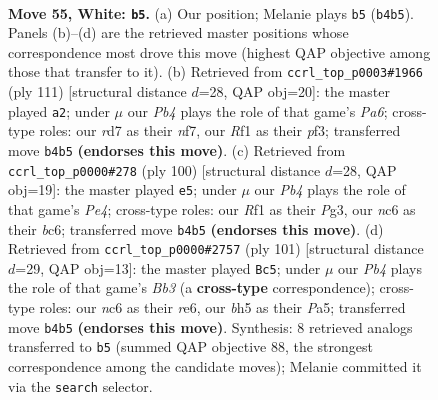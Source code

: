 \documentclass[11pt]{article}
\begin{document}
\clearpage

\begin{figure}[p]\centering
\begin{subfigure}{0.46\textwidth}\centering
\resizebox{\linewidth}{!}{%
\newchessgame
\chessboard[
  setfen={2k5/3r4/p1n2P2/7b/PP6/2B5/7K/5R2 w - - 1 55},
  showmover=false,
  pgfstyle=straightmove, color=movearrow, markmove={b4-b5}
]}
\caption{}
\end{subfigure}\hfill
\begin{subfigure}{0.46\textwidth}\centering
\resizebox{\linewidth}{!}{%
\newchessgame
\chessboard[
  setfen={5b2/2p2N1k/2p5/8/2P5/p4P2/2N1K3/8 b - - 0 56},
  showmover=false,
  pgfstyle=straightmove, color=movearrow, markmove={a3-a2}
]}
\caption{}
\end{subfigure}
\\[4pt]
\begin{subfigure}{0.46\textwidth}\centering
\resizebox{\linewidth}{!}{%
\newchessgame
\chessboard[
  setfen={8/2B4p/p1b5/P5k1/3KP3/6P1/8/8 w - - 2 51},
  showmover=false,
  pgfstyle=straightmove, color=movearrow, markmove={e4-e5}
]}
\caption{}
\end{subfigure}\hfill
\begin{subfigure}{0.46\textwidth}\centering
\resizebox{\linewidth}{!}{%
\newchessgame
\chessboard[
  setfen={5k2/6p1/1b2R2p/pB5P/3r4/6P1/6K1/8 b - - 4 51},
  showmover=false,
  pgfstyle=straightmove, color=movearrow, markmove={b6-c5}
]}
\caption{}
\end{subfigure}
\caption{\textbf{Move 55, White: \texttt{b5}.} (a) Our position; Melanie plays \texttt{b5} (\texttt{b4b5}). Panels (b)--(d) are the retrieved master positions whose correspondence most drove this move (highest QAP objective among those that transfer to it). (b) Retrieved from \texttt{ccrl\_top\_p0003\#1966} (ply 111) [structural distance $d$=28, QAP obj=20]: the master played \texttt{a2}; under $\mu$ our \emph{Pb4} plays the role of that game's \emph{Pa6}; cross-type roles: our \emph{r}d7 as their \emph{n}f7, our \emph{R}f1 as their \emph{p}f3; transferred move \texttt{b4b5} \textbf{(endorses this move)}. (c) Retrieved from \texttt{ccrl\_top\_p0000\#278} (ply 100) [structural distance $d$=28, QAP obj=19]: the master played \texttt{e5}; under $\mu$ our \emph{Pb4} plays the role of that game's \emph{Pe4}; cross-type roles: our \emph{R}f1 as their \emph{P}g3, our \emph{n}c6 as their \emph{b}c6; transferred move \texttt{b4b5} \textbf{(endorses this move)}. (d) Retrieved from \texttt{ccrl\_top\_p0000\#2757} (ply 101) [structural distance $d$=29, QAP obj=13]: the master played \texttt{Bc5}; under $\mu$ our \emph{Pb4} plays the role of that game's \emph{Bb3} (a \textbf{cross-type} correspondence); cross-type roles: our \emph{n}c6 as their \emph{r}e6, our \emph{b}h5 as their \emph{P}a5; transferred move \texttt{b4b5} \textbf{(endorses this move)}. Synthesis: 8 retrieved analogs transferred to \texttt{b5} (summed QAP objective 88, the strongest correspondence among the candidate moves); Melanie committed it via the \texttt{search} selector.}
\label{fig:thought-m108}
\end{figure}
\end{document}
